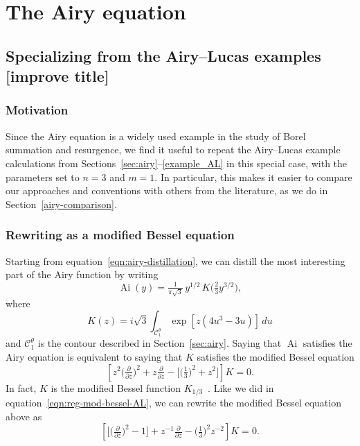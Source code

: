 \documentclass{article}
\DeclareMathOperator{\Ai}{Ai}
\theoremstyle{definition}
\theoremstyle{plain}
\newenvironment{todo}{\color{Coral}}{\color{black}}
\newenvironment{revised}{\color{DarkBlue}}{\color{black}}
\begin{document}
\section{The Airy equation}\label{airy-appendix}
\subsection{Specializing from the Airy--Lucas examples \begin{todo}[improve title]\end{todo}}
\begin{revised}
\subsubsection{Motivation}
Since the Airy equation is a widely used example in the study of Borel summation and resurgence, we find it useful to repeat the Airy--Lucas example calculations from Sections~\ref{sec:airy}--\ref{example_AL} in this special case, with the parameters set to $n = 3$ and $m = 1$. In particular, this makes it easier to compare our approaches and conventions with others from the literature, as we do in Section~\ref{airy-comparison}.
\subsubsection{Rewriting as a modified Bessel equation}
Starting from equation~\eqref{eqn:airy-distillation}, we can distill the most interesting part of the Airy function by writing
\[ \Ai(y) = \tfrac{1}{\pi\sqrt{3}}\,y^{1/2}\,K\big(\tfrac{2}{3} y^{3/2}\big), \]
where
\begin{equation}\label{integral:mod-bessel}
K(z) = i\sqrt{3} \int_{\mathcal{C}^\theta_1} \exp\left[z \left(4u^3 - 3u\right)\right]\,du
\end{equation}
and $\mathcal{C}^\theta_1$ is the contour described in Section~\ref{sec:airy}. Saying that $\Ai$ satisfies the Airy equation is equivalent to saying that $K$ satisfies the modified Bessel equation
\begin{equation}\label{eqn:mod-bessel-1/3}
\left[z^2 \big(\tfrac{\partial}{\partial z}\big)^2 + z \tfrac{\partial}{\partial z} - \big[\big(\tfrac{1}{3}\big)^2 + z^2\big]\right] K = 0.
\end{equation}
In fact, $K$ is the modified Bessel function $K_{1/3}$~\cite[equation~9.6.1]{dlmf}. Like we did in equation~\eqref{eqn:reg-mod-bessel-AL}, we can rewrite the modified Bessel equation above as 
\begin{equation}\label{eqn:reg-mod-bessel}
\left[ \big[ \big(\tfrac{\partial}{\partial z}\big)^2 - 1 \big] + z^{-1} \tfrac{\partial}{\partial z} - \big(\tfrac{1}{3}\big)^2 z^{-2} \right] K = 0.
\end{equation}
%
\end{revised}
%
\end{document}
